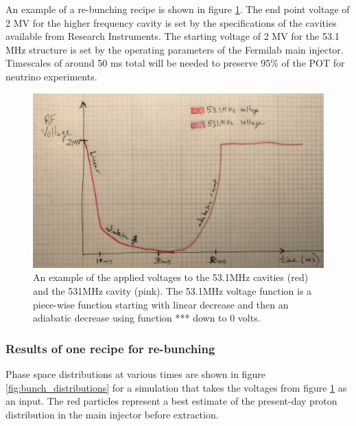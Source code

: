 An example of a re-bunching recipe is shown in figure
\ref{fig:transition_voltages}. The end point voltage of 2 MV for the
higher frequency cavity is set by the specifications of the cavities
available from Research Instruments. The starting voltage of 2 MV for
the 53.1 MHz structure is set by the operating parameters of the
Fermilab main injector. Timescales of around 50 ms total will be
needed to preserve 95\% of the POT for neutrino experiments.

\begin{figure}[t]
	\begin{center}
        \includegraphics[width=0.60\linewidth]{Figures/draft_transition_voltages.JPG}
	\end{center}
	\caption{An example of the applied voltages to the 53.1MHz
          cavities (red) and the 531MHz cavity (pink). The 53.1MHz
          voltage function is a piece-wise function starting with
          linear decrease and then an adiabatic decrease using
          function *** down to 0 volts.}
		\label{fig:transition_voltages}
\end{figure}

\subsubsection{Results of one recipe for re-bunching}

Phase space distributions at various times are shown in figure
\ref{fig:bunch_distributions} for a simulation that takes the voltages
from figure \ref{fig:transition_voltages} as an input. The red
particles represent a best estimate of the present-day proton
distribution in the main injector before extraction.

